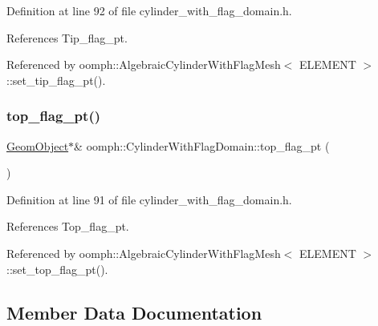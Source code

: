 Definition at line 92 of file cylinder\+\_\+with\+\_\+flag\+\_\+domain.\+h.



References Tip\+\_\+flag\+\_\+pt.



Referenced by oomph\+::\+Algebraic\+Cylinder\+With\+Flag\+Mesh$<$ E\+L\+E\+M\+E\+N\+T $>$\+::set\+\_\+tip\+\_\+flag\+\_\+pt().

\mbox{\label{classoomph_1_1CylinderWithFlagDomain_a268642db566b31b686ba8185e8610d8a}} 
\subsubsection{\texorpdfstring{top\+\_\+flag\+\_\+pt()}{top\_flag\_pt()}}
{\footnotesize\ttfamily \hyperlink{classoomph_1_1GeomObject}{Geom\+Object}$\ast$\& oomph\+::\+Cylinder\+With\+Flag\+Domain\+::top\+\_\+flag\+\_\+pt (\begin{DoxyParamCaption}{ }\end{DoxyParamCaption})\hspace{0.3cm}{\ttfamily [inline]}}



Definition at line 91 of file cylinder\+\_\+with\+\_\+flag\+\_\+domain.\+h.



References Top\+\_\+flag\+\_\+pt.



Referenced by oomph\+::\+Algebraic\+Cylinder\+With\+Flag\+Mesh$<$ E\+L\+E\+M\+E\+N\+T $>$\+::set\+\_\+top\+\_\+flag\+\_\+pt().



\subsection{Member Data Documentation}
\mbox{\label{classoomph_1_1CylinderWithFlagDomain_afdb4b1beb7e574e1bcfc7fbb8a6df700}} 
